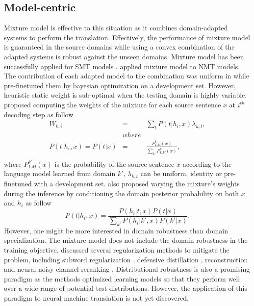 \subsection{Model-centric}
Mixture model is effective to this situation as it combines domain-adapted systems to perform the translation. Effectively, the performance of mixture model is guaranteed in the source domains while using a convex combination of the adapted systems is robust against the unseen domains. Mixture model has been successfully applied for SMT models \citep{Sennrich12perplexity, Carpuat14linear, Sennrich12mixture}. \citet{Sajjad17neural, Saunders19domain,Freitag16fast} applied mixture model to NMT models. The contribution of each adapted model to the combination was uniform in \citet{Freitag16fast} while \citet{Sajjad17neural} pre-finetuned them by bayesian optimization on a development set. However, heuristic static weight is sub-optimal when the testing domain is highly variable. \citet{Saunders19domain} proposed computing the weights of the mixture for each source sentence $x$ at $i^{th}$ decoding step as follow
\begin{equation}
\begin{array}{rcl}
W_{k,i} &=& \displaystyle{\mathop{\sum}_{t} P(t|h_i,x)\lambda_{k,t}}, \\
&where& \\
P(t|h_i,x) = P(t|x) &=& \frac{\displaystyle{P^k_{LM}(x)}}{\displaystyle{\mathop{\sum}_{k'} P^{k'}_{LM}(x)}},\\
\end{array}
\end{equation}
where $P^{k'}_{LM}(x)$ is the probability of the source sentence $x$ according to the language model learned from domain $k'$, $\lambda_{k,t}$ can be uniform, identity or pre-finetuned with a development set. \citet{Saunders19domain} also proposed varying the mixture's weights during the inference by conditioning the domain posterior probability on both $x$ and $h_i$ as follow
\begin{equation}
P(t|h_i,x) = \frac{P(h_i|t,x) P(t|x)}{\displaystyle{\mathop{\sum}_{k'} P(h_i|k',x) P(k'|x)}}.
\end{equation} 
However, one might be more interested in domain robustness than domain specialization. The mixture model does not include the domain robustness in the training objective. \citet{Muller20domain} discussed several regularization methods to mitigate the problem, including subword regularization \citep{Taku18subword}, defensive distillation \citep{Papernot16distillation}, reconstruction \citep{Tu17neural} and neural noisy channel reranking \citep{Li16mutual}. Distributional robustness \citep{Oren19distributionally,BenTal13robust} is also a promising paradigm as the methods optimized learning models so that they perform well over a wide range of potential test distributions. However, the application of this paradigm to neural machine translation is not yet discovered.
